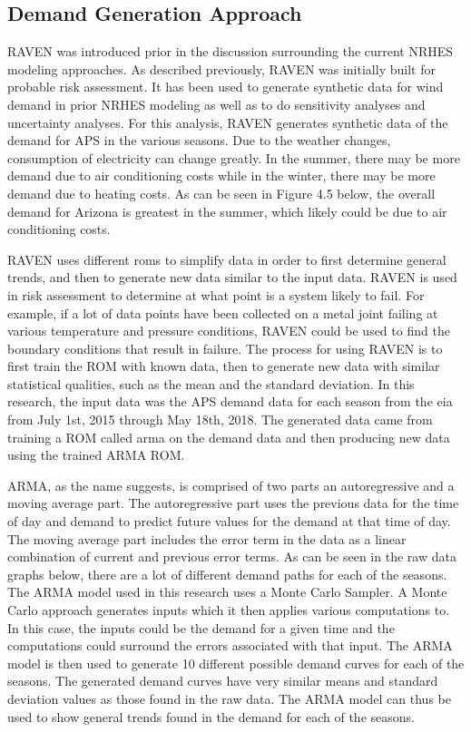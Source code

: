 \documentclass[12pt]{UIdahoMastersThesis}
\begin{document}
\subsection{Demand Generation Approach}
RAVEN was introduced prior in the discussion surrounding the current NRHES modeling approaches.  As described previously, RAVEN was initially built for probable risk assessment.  It has been used to generate synthetic data for wind demand in prior NRHES modeling as well as to do sensitivity analyses and uncertainty analyses.  For this analysis, RAVEN generates synthetic data of the demand for APS in the various seasons.  Due to the weather changes, consumption of electricity can change greatly.  In the summer, there may be more demand due to air conditioning costs while in the winter, there may be more demand due to heating costs.  As can be seen in Figure 4.5 below, the overall demand for Arizona is greatest in the summer, which likely could be due to air conditioning costs. 

RAVEN uses different \ac{roms} to simplify data in order to first determine general trends, and then to generate new data similar to the input data. RAVEN is used in risk assessment to determine at what point is a system likely to fail. For example, if a lot of data points have been collected on a metal joint failing at various temperature and pressure conditions, RAVEN could be used to find the boundary conditions that result in failure. The process for using RAVEN is to first train the ROM with known data, then to generate new data with similar statistical qualities, such as the mean and the standard deviation. In this research, the input data was the APS demand data for each season from the \ac{eia} from July 1st, 2015 through May 18th, 2018. The generated data came from training a ROM called \ac{arma} on the demand data and then producing new data using the trained ARMA ROM.

ARMA, as the name suggests, is comprised of two parts an autoregressive and a moving average part.  The autoregressive part uses the previous data for the time of day and demand to predict future values for the demand at that time of day. The moving average part includes the error term in the data as a linear combination of current and previous error terms. As can be seen in the raw data graphs below, there are a lot of different demand paths for each of the seasons. The ARMA model used in this research uses a Monte Carlo Sampler.  A Monte Carlo approach generates inputs which it then applies various computations to. In this case, the inputs could be the demand for a given time and the computations could surround the errors associated with that input. The ARMA model is then used to generate 10 different possible demand curves for each of the seasons.  The generated demand curves have very similar means and standard deviation values as those found in the raw data. The ARMA model can thus be used to show general trends found in the demand for each of the seasons.
\end{document}
